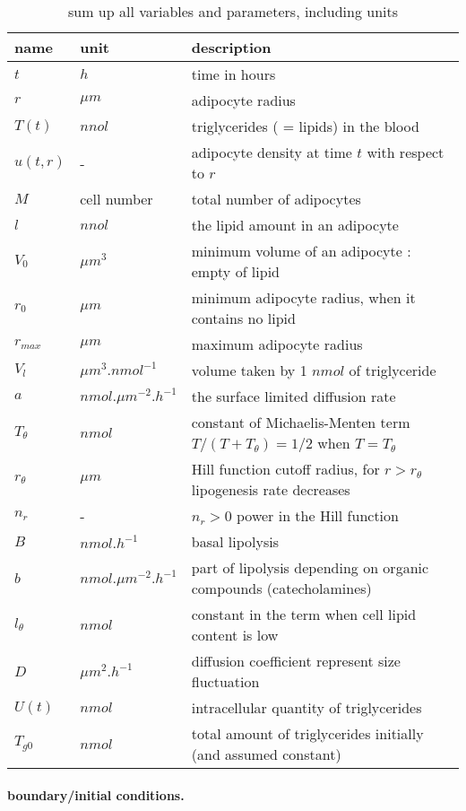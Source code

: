 \documentclass[11pt,a4paper]{article}
\begin{document}
\begin{table}
\begin{tabular}{l|l|l}
name & unit & description \\
\hline 
$t$ & $h$ & time in hours \\
$r$ & $\mu m$ & adipocyte radius \\
$T(t)$ &  $nnol$ & triglycerides ( = lipids) in the blood \\
$u(t,r)$ & - & adipocyte density at time $t$ with respect to $r$ \\
$M$ & cell number & total number of adipocytes \\
$l$ & $nnol$ & the lipid amount in an adipocyte \\
$V_0$ & $\mu m ^3$ & minimum volume of an adipocyte : empty of lipid \\
$r_0$ & $\mu m$ & minimum adipocyte radius, when it contains no lipid \\
$r_{max}$ & $\mu m$ & maximum adipocyte radius \\
$V_l$ &  $\mu m ^3 . nmol^{-1}$ & volume taken by 1 $nmol$ of triglyceride \\ 
$a$ & $nmol. \mu m ^{-2} . h^{-1}$ & the surface limited diffusion rate  \\
$T_{\theta}$ & $nmol$ & constant of Michaelis-Menten term $T/(T+T_{\theta}) = 1/2$ when $T = T_{\theta}$ \\
$r_{\theta}$ & $\mu m$ & Hill function cutoff radius, for $r > r_{\theta}$ lipogenesis rate decreases  \\
$n_r$ & - & $n_r > 0$ power in the Hill function \\
$B$ & $nmol . h^{-1}$ & basal lipolysis \\
$b$ & $nmol .\mu m ^{-2} . h^{-1}$ & part of lipolysis depending on organic compounds (catecholamines) \\
$l_{\theta}$ & $nmol$ & constant in the term when cell lipid content is low \\
$D$ & $\mu m^2 . h^{-1}$ & diffusion coefficient represent size fluctuation \\
$U(t)$ & $nmol$ & intracellular quantity of triglycerides \\
$T_{g0}$ & $nmol$ & total amount of triglycerides initially (and assumed constant)
\end{tabular}\caption{sum up all variables and parameters, including units} \label{Tab:VarParUnits}
\end{table}

\paragraph{boundary/initial conditions.}
\end{document}
